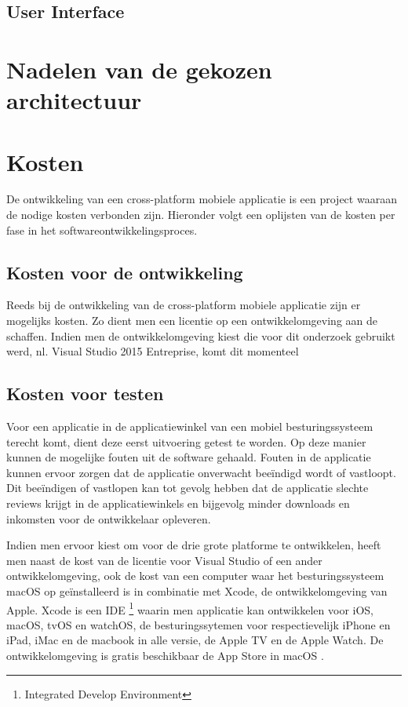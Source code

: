 \subsection{User Interface}


\label{sec:nadelenvandegekozenapparchitectuur}
\section{Nadelen van de gekozen architectuur}

\label{sec:apposten}
\section{Kosten}
De ontwikkeling van een cross-platform mobiele applicatie is een project waaraan de nodige kosten verbonden zijn.
Hieronder volgt een oplijsten van de kosten per fase in het softwareontwikkelingsproces.

\subsection{Kosten voor de ontwikkeling}
Reeds bij de ontwikkeling van de cross-platform mobiele applicatie zijn er mogelijks kosten. Zo dient men een licentie op een ontwikkelomgeving
aan de schaffen. Indien men de ontwikkelomgeving kiest die voor dit onderzoek gebruikt werd, nl. Visual Studio 2015 Entreprise, komt dit momenteel

\subsection{Kosten voor testen}
Voor een applicatie in de applicatiewinkel van een mobiel besturingssysteem terecht komt, dient deze eerst uitvoering getest te
worden. Op deze manier kunnen de mogelijke fouten uit de software gehaald. Fouten in de applicatie kunnen ervoor zorgen dat de applicatie
onverwacht beeïndigd wordt of vastloopt.
Dit beeïndigen of vastlopen kan tot gevolg hebben dat de applicatie slechte reviews krijgt in de applicatiewinkels en bijgevolg minder downloads en inkomsten voor de ontwikkelaar opleveren.

Indien men ervoor kiest om voor de drie grote platforme te ontwikkelen, heeft men naast de kost van de licentie voor Visual Studio of een ander ontwikkelomgeving,
ook de kost van een computer waar het besturingssysteem macOS op geïnstalleerd is in combinatie met Xcode, de ontwikkelomgeving van Apple.
Xcode is een IDE \footnote{Integrated Develop Environment} waarin men applicatie kan ontwikkelen voor iOS, macOS, tvOS en watchOS, de besturingssytemen voor respectievelijk iPhone en iPad,
iMac en de macbook in alle versie, de Apple TV en de Apple Watch. De ontwikkelomgeving is gratis beschikbaar de App Store in macOS \cite{xcodeindemacappstore2017}.

